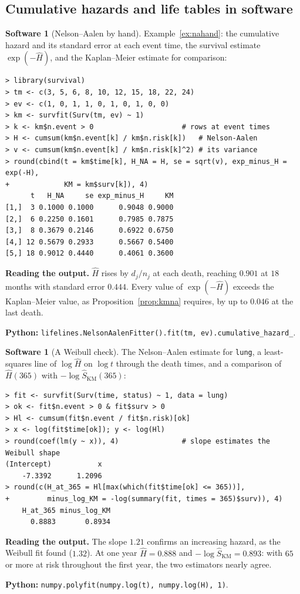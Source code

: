 \documentclass[11pt,a4paper]{article}
\numberwithin{equation}{section}
\theoremstyle{definition}
\newtheorem{software}[thm]{Software}
\begin{document}
\subsection{Cumulative hazards and life tables in software}
\label{ssec:software5}

\begin{software}[Nelson--Aalen by hand]
\label{sw:na}
Example~\ref{ex:nahand}: the cumulative hazard and its standard error at each event time, the survival estimate $\exp(-\hat H)$, and the Kaplan--Meier estimate for comparison:
{\small\begin{verbatim}
> library(survival)
> tm <- c(3, 5, 6, 8, 10, 12, 15, 18, 22, 24)
> ev <- c(1, 0, 1, 1, 0, 1, 0, 1, 0, 0)
> km <- survfit(Surv(tm, ev) ~ 1)
> k <- km$n.event > 0                     # rows at event times
> H <- cumsum(km$n.event[k] / km$n.risk[k])   # Nelson-Aalen
> v <- cumsum(km$n.event[k] / km$n.risk[k]^2) # its variance
> round(cbind(t = km$time[k], H_NA = H, se = sqrt(v), exp_minus_H = exp(-H),
+             KM = km$surv[k]), 4)
      t   H_NA     se exp_minus_H     KM
[1,]  3 0.1000 0.1000      0.9048 0.9000
[2,]  6 0.2250 0.1601      0.7985 0.7875
[3,]  8 0.3679 0.2146      0.6922 0.6750
[4,] 12 0.5679 0.2933      0.5667 0.5400
[5,] 18 0.9012 0.4440      0.4061 0.3600
\end{verbatim}}
\textbf{Reading the output.} $\hat H$ rises by $d_j/n_j$ at each death, reaching $0.901$ at $18$ months with standard error $0.444$. Every value of $\exp(-\hat H)$ exceeds the Kaplan--Meier value, as Proposition~\ref{prop:kmna} requires, by up to $0.046$ at the last death.

\textbf{Python:} \texttt{lifelines.NelsonAalenFitter().fit(tm, ev).cumulative\_hazard\_}.
\end{software}

\begin{software}[A Weibull check]
\label{sw:loglog}
The Nelson--Aalen estimate for \texttt{lung}, a least-squares line of $\log\hat H$ on $\log t$ through the death times, and a comparison of $\hat H(365)$ with $-\log\hat S_{\text{KM}}(365)$:
{\small\begin{verbatim}
> fit <- survfit(Surv(time, status) ~ 1, data = lung)
> ok <- fit$n.event > 0 & fit$surv > 0
> Hl <- cumsum(fit$n.event / fit$n.risk)[ok]
> x <- log(fit$time[ok]); y <- log(Hl)
> round(coef(lm(y ~ x)), 4)               # slope estimates the Weibull shape
(Intercept)           x 
    -7.3392      1.2096 
> round(c(H_at_365 = Hl[max(which(fit$time[ok] <= 365))],
+         minus_log_KM = -log(summary(fit, times = 365)$surv)), 4)
    H_at_365 minus_log_KM 
      0.8883       0.8934 
\end{verbatim}}
\textbf{Reading the output.} The slope $1.21$ confirms an increasing hazard, as the Weibull fit found ($1.32$). At one year $\hat H = 0.888$ and $-\log\hat S_{\text{KM}} = 0.893$: with $65$ or more at risk throughout the first year, the two estimators nearly agree.

\textbf{Python:} \texttt{numpy.polyfit(numpy.log(t), numpy.log(H), 1)}.
\end{software}
\end{document}
